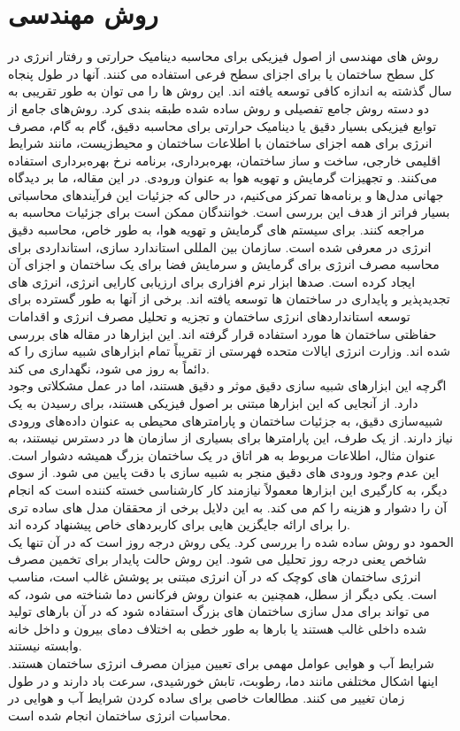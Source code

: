 \section{روش مهندسی}


روش های مهندسی از اصول فیزیکی برای محاسبه دینامیک حرارتی و رفتار انرژی در کل سطح ساختمان یا برای اجزای سطح فرعی استفاده می کنند. آنها در طول پنجاه سال گذشته به اندازه کافی توسعه یافته اند. این روش ها را می توان به طور تقریبی به دو دسته روش جامع تفصیلی و روش ساده شده طبقه بندی کرد. روش‌های جامع از توابع فیزیکی بسیار دقیق یا دینامیک حرارتی برای محاسبه دقیق، گام به گام، مصرف انرژی برای همه اجزای ساختمان با اطلاعات ساختمان و محیط‌زیست، مانند شرایط اقلیمی خارجی، ساخت و ساز ساختمان، بهره‌برداری، برنامه نرخ بهره‌برداری استفاده می‌کنند. و تجهیزات گرمایش و تهویه هوا به عنوان ورودی. در این مقاله، ما بر دیدگاه جهانی مدل‌ها و برنامه‌ها تمرکز می‌کنیم، در حالی که جزئیات این فرآیندهای محاسباتی بسیار فراتر از هدف این بررسی است. خوانندگان ممکن است برای جزئیات محاسبه به \cite{clarke2001energy} مراجعه کنند. برای سیستم های گرمایش و تهویه هوا، به طور خاص، محاسبه دقیق انرژی در \cite{mcquiston2004heating} معرفی شده است. سازمان بین المللی استاندارد سازی، استانداردی برای محاسبه مصرف انرژی برای گرمایش و سرمایش فضا برای یک ساختمان و اجزای آن ایجاد کرده است. صدها ابزار نرم افزاری برای ارزیابی کارایی انرژی، انرژی های تجدیدپذیر و پایداری در ساختمان ها توسعه یافته اند. برخی از آنها به طور گسترده برای توسعه استانداردهای انرژی ساختمان و تجزیه و تحلیل مصرف انرژی و اقدامات حفاظتی ساختمان ها مورد استفاده قرار گرفته اند. این ابزارها در مقاله های \cite{CRAWLEY2008661,al2001computer} بررسی شده اند. وزارت انرژی ایالات متحده فهرستی از تقریباً تمام ابزارهای شبیه سازی را که دائماً به روز می شود، نگهداری می کند.
\\
اگرچه این ابزارهای شبیه سازی دقیق موثر و دقیق هستند، اما در عمل مشکلاتی وجود دارد. از آنجایی که این ابزارها مبتنی بر اصول فیزیکی هستند، برای رسیدن به یک شبیه‌سازی دقیق، به جزئیات ساختمان و پارامترهای محیطی به عنوان داده‌های ورودی نیاز دارند. از یک طرف، این پارامترها برای بسیاری از سازمان ها در دسترس نیستند، به عنوان مثال، اطلاعات مربوط به هر اتاق در یک ساختمان بزرگ همیشه دشوار است. این عدم وجود ورودی های دقیق منجر به شبیه سازی با دقت پایین می شود. از سوی دیگر، به کارگیری این ابزارها معمولاً نیازمند کار کارشناسی خسته کننده است که انجام آن را دشوار و هزینه را کم می کند. به این دلایل برخی از محققان مدل های ساده تری را برای ارائه جایگزین هایی برای کاربردهای خاص پیشنهاد کرده اند.
\\
الحمود \cite{al2001computer} دو روش ساده شده را بررسی کرد. یکی روش درجه روز است که در آن تنها یک شاخص یعنی درجه روز تحلیل می شود. این روش حالت پایدار برای تخمین مصرف انرژی ساختمان های کوچک که در آن انرژی مبتنی بر پوشش غالب است، مناسب است. یکی دیگر از سطل، همچنین به عنوان روش فرکانس دما شناخته می شود، که می تواند برای مدل سازی ساختمان های بزرگ استفاده شود که در آن بارهای تولید شده داخلی غالب هستند یا بارها به طور خطی به اختلاف دمای بیرون و داخل خانه وابسته نیستند.
\\
شرایط آب و هوایی عوامل مهمی برای تعیین میزان مصرف انرژی ساختمان هستند. اینها اشکال مختلفی مانند دما، رطوبت، تابش خورشیدی، سرعت باد دارند و در طول زمان تغییر می کنند. مطالعات خاصی برای ساده کردن شرایط آب و هوایی در محاسبات انرژی ساختمان انجام شده است.







